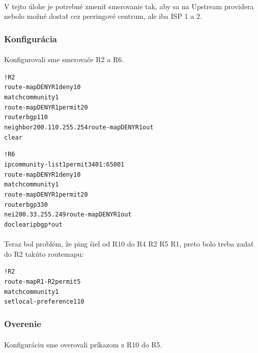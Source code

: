\documentclass[12pt,twoside,a4paper]{report}
\begin{document}
\paragraph{}
V tejto úlohe je potrebné zmeniť smerovanie tak, aby sa na Upstream providera nebolo možné dostať cez peeringové centrum, ale iba ISP 1 a 2.

\subsubsection{Konfigurácia}
\paragraph{}
Konfigurovali sme smerovače R2 a R6.

\noindent
{\selectfont
\begin{small}
\begin{alltt}
!R2
route-map DENYR1 deny 10
  match community 1
route-map DENYR1 permit 20
router bgp 110
  neighbor 200.110.255.254 route-map DENYR1 out
clear


!R6
ip community-list 1 permit 3401:65001
route-map DENYR1 deny 10
 match community 1
route-map DENYR1 permit 20
router bgp 330
 nei 200.33.255.249 route-map DENYR1 out
do clear ip bgp * out
\end{alltt}
\end{small}
}

\paragraph{}
Teraz bol problém, že ping šiel od R10 do R4 R2 R5 R1, preto bolo treba zadať do R2 takúto routemapu:

\noindent
{\selectfont
\begin{small}
\begin{alltt}
!R2
route-map R1-R2 permit 5
 match community 1
 set local-preference 110
\end{alltt}
\end{small}
}

\subsubsection{Overenie}
\paragraph{}
Konfiguráciu sme overovali príkazom  z R10 do R5.
\end{document}
